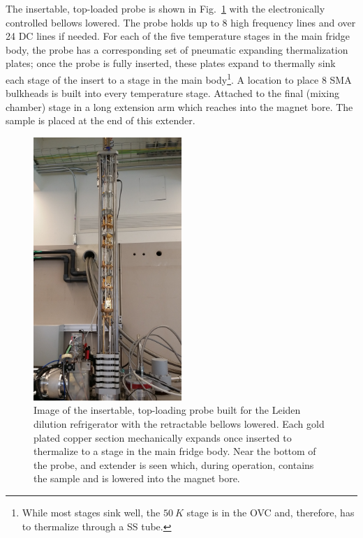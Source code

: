 The insertable, top-loaded probe is shown in Fig.~\ref{Fig:Appen:Leiden_bellows_open} with the electronically controlled bellows lowered. The probe holds up to 8 high frequency lines and over 24 DC lines if needed. For each of the five temperature stages in the main fridge body, the probe has a corresponding set of pneumatic expanding thermalization plates; once the probe is fully inserted, these plates expand to thermally sink each stage of the insert to a stage in the main body\footnote{While most stages sink well, the $50~K$ stage is in the OVC and, therefore, has to thermalize through a SS tube.}. A location to place 8 SMA bulkheads is built into every temperature stage. Attached to the final (mixing chamber) stage in a long extension arm which reaches into the magnet bore. The sample is placed at the end of this extender. 
\begin{figure}
\centering
\includegraphics[angle=-90,width = 0.5\textwidth]{figures/appendix/cryostats/Leiden_bellows_open.jpg}
\caption{Image of the insertable, top-loading probe built for the Leiden dilution refrigerator with the retractable bellows lowered. Each gold plated copper section mechanically expands once inserted to thermalize to a stage in the main fridge body. Near the bottom of the probe, and extender is seen which, during operation, contains the sample and is lowered into the magnet bore.}
\label{Fig:Appen:Leiden_bellows_open}
\end{figure}

